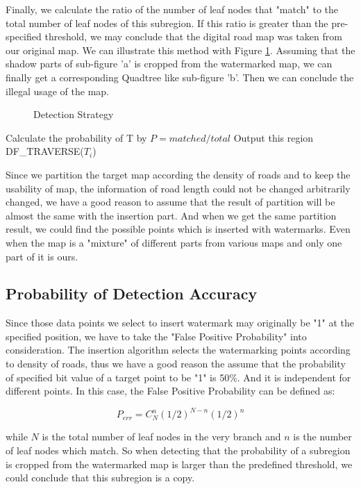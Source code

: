 Finally, we calculate the ratio of the number of leaf nodes that "match" to the total number 
of leaf nodes of this subregion. If this ratio is greater than the pre-specified threshold, 
we may conclude that the digital road map was taken from our original map. We can illustrate
this method with Figure \ref{fig:14}. Assuming that the shadow parts of sub-figure 'a' is 
cropped from the watermarked map, we can finally get a corresponding Quadtree like sub-figure 'b'.
Then we can conclude the illegal usage of the map.

\begin{figure}[h]
\centering
{}
\caption{Detection Strategy}
\label{fig:14}
\end{figure} 

\begin{algorithm}[h]
\begin{algorithmic}[1]
\Statex
{}
\State Calculate the probability of T by $P = matched/total$
\State Output this region
\Else{}
\State DF\_TRAVERSE(${T}_{i}$)
\EndFor
\EndIf
\EndFunction
\Statex
\end{algorithmic}
\end{algorithm}


Since we partition the target map according the density of roads and to keep the usability of map, 
the information of road length could not be changed arbitrarily changed, we have a good reason to 
assume that the result of partition will be almost the same with the insertion part. And when we 
get the same partition result, we could find the possible points which is inserted with watermarks.
Even when the map is a "mixture" of different parts from various maps and only one part of it is ours.


\subsection{Probability of Detection Accuracy}
Since those data points we select to insert watermark may originally be "1" at the
 specified position, we have to take the "False Positive Probability" into
 consideration. The insertion algorithm selects the watermarking points according
 to density of roads, thus we have a good reason the assume that the probability of
 specified bit value of a target point to be "1" is 50\%. And it is independent for
 different points. In this case, the False Positive Probability can be defined as:

\begin{equation}
{ P }_{ err }={ C }_{ N }^{ n }{ ({ 1 }/{ 2 }) }^{ N-n }{ ({ 1 }/{ 2 }) }^{ n }
\end{equation}

while $N$ is the total number of leaf nodes in the very branch and $n$ is the number of leaf nodes which match. 
So when detecting that the probability of a subregion is cropped from the watermarked map is larger than the predefined threshold, we could conclude that this subregion is a copy.

